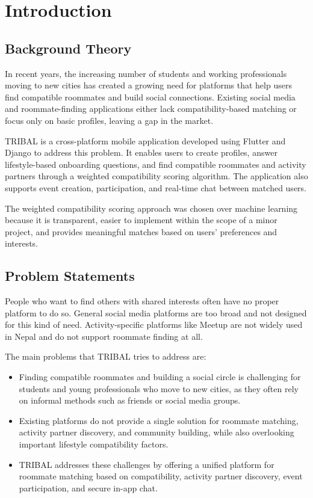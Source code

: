 \chapter{Introduction}
 
 \section{Background Theory}
 
In recent years, the increasing number of students and working professionals moving to new cities has created a growing need for platforms that help users find compatible roommates and build social connections. Existing social media and roommate-finding applications either lack compatibility-based matching or focus only on basic profiles, leaving a gap in the market.

TRIBAL is a cross-platform mobile application developed using Flutter and Django to address this problem. It enables users to create profiles, answer lifestyle-based onboarding questions, and find compatible roommates and activity partners through a weighted compatibility scoring algorithm. The application also supports event creation, participation, and real-time chat between matched users.

The weighted compatibility scoring approach was chosen over machine learning because it is transparent, easier to implement within the scope of a minor project, and provides meaningful matches based on users' preferences and interests.

 \section{Problem Statements}
People who want to find others with shared interests often have no proper platform to do so. General social media platforms are too broad and not designed for this kind of need. Activity-specific platforms like Meetup are not widely used in Nepal and do not support roommate finding at all.

The main problems that TRIBAL tries to address are:
\begin{itemize}
\item Finding compatible roommates and building a social circle is challenging for students and young professionals who move to new cities, as they often rely on informal methods such as friends or social media groups.


\item Existing platforms do not provide a single solution for roommate matching, activity partner discovery, and community building, while also overlooking important lifestyle compatibility factors.

\item TRIBAL addresses these challenges by offering a unified platform for roommate matching based on compatibility, activity partner discovery, event participation, and secure in-app chat.


\end{itemize}


